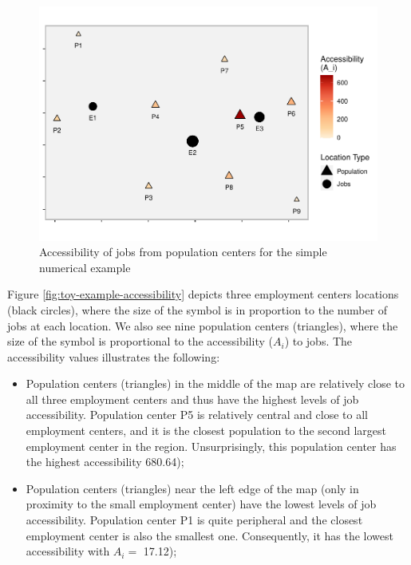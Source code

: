 \documentclass[]{elsarticle} %
\begin{document}
\begin{figure}
\includegraphics[width=1\linewidth]{Spatial-Availability_files/figure-latex/toy-example-accessibility-plot-1} \caption{\label{fig:toy-example-accessibility}Accessibility of jobs from population centers for the simple numerical example}\label{fig:toy-example-accessibility-plot}
\end{figure}

Figure \ref{fig:toy-example-accessibility} depicts three employment
centers locations (black circles), where the size of the symbol is in
proportion to the number of jobs at each location. We also see nine
population centers (triangles), where the size of the symbol is
proportional to the accessibility (\(A_i\)) to jobs. The accessibility
values illustrates the following:

\begin{itemize}
\item
  Population centers (triangles) in the middle of the map are relatively
  close to all three employment centers and thus have the highest levels
  of job accessibility. Population center P5 is relatively central and
  close to all employment centers, and it is the closest population to
  the second largest employment center in the region. Unsurprisingly,
  this population center has the highest accessibility 680.64);
\item
  Population centers (triangles) near the left edge of the map (only in
  proximity to the small employment center) have the lowest levels of
  job accessibility. Population center P1 is quite peripheral and the
  closest employment center is also the smallest one. Consequently, it
  has the lowest accessibility with \(A_i=\) 17.12);
\end{itemize}
\end{document}
